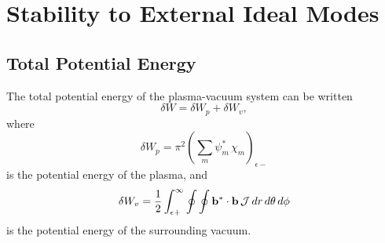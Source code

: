 \documentclass[12pt,prb,aps,notitlepage]{revtex4-1}
\begin{document}
\section{Stability to External Ideal Modes}
\subsection{Total Potential Energy}
The total potential energy of the plasma-vacuum system can be written
\begin{equation}\label{e79}
\delta W= \delta W_p + \delta W_v,
\end{equation}
where
\begin{equation}\label{e80}
\delta W_p= \pi^2\left(\sum_m\psi_m^\ast\,\chi_m\right)_{\epsilon-}
\end{equation}
is the potential energy of the plasma, 
and
\begin{equation}
\delta W_v = \frac{1}{2}\int_{\epsilon+}^\infty\oint\oint {\bf b}^\ast\cdot{\bf b} \,{\cal J}\,dr\,d\theta\,d\phi
\end{equation}
is the potential energy of the surrounding vacuum.
\end{document}
